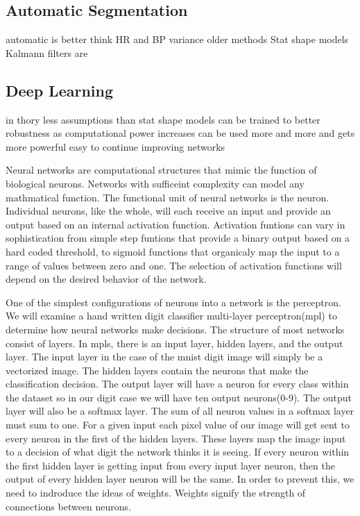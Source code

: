 \documentclass[12pt]{article}
\begin{document}
\subsection{Automatic Segmentation}
automatic is better think HR and BP
variance
older methods
Stat shape models
Kalmann filters are
\subsection{Deep Learning}
in thory less assumptions than stat shape models
can be trained to better robustness
as computational power increases can be used more and more and gets more powerful
easy to continue improving networks
\par %
Neural networks are computational structures that mimic the function of biological neurons. Networks with sufficeint complexity can model any mathmatical function. 
The functional unit of neural networks is the neuron.
Individual neurons, like the whole, will each receive an input and provide an output based on an internal activation function.
Activation funtions can vary in sophistication from simple step funtions that provide a binary output based on a hard coded threshold,
to sigmoid functions that organicaly map the input to a range of values between zero and one.
The selection of activation functions will depend on the desired behavior of the network. 
\par
One of the simplest configurations of neurons into a network is the perceptron.
We will examine a hand written digit classifier multi-layer perceptron(mpl) to determine how neural networks make decisions.
The structure of most networks consist of layers. In mpls, there is an input layer, hidden layers, and the output layer. 
The input layer in the case of the mnist digit image will simply be a vectorized image. The hidden layers contain the neurons that make the classification decision.
The output layer will have a neuron for every class within the dataset so in our digit case we will have ten output neurons(0-9). The output layer will also be a softmax layer. 
The sum of all neuron values in a softmax layer must sum to one.
For a given input each pixel value of our image will get sent to every neuron in the first of the hidden layers.
These layers map the image input to a decision of what digit the network thinks it is seeing.
If every neuron within the first hidden layer is getting input from every input layer neuron, then the output of every hidden layer neuron will be the same. 
In order to prevent this, we need to indroduce the ideas of weights. Weights signify the strength of connections between neurons.
\end{document}
